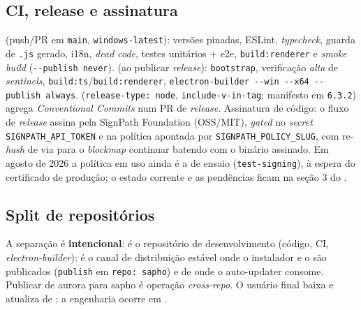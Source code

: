 \subsection{CI, release e assinatura}
\label{sec:S13-ci}
 (push/PR em \texttt{main}, \texttt{windows-latest}): versões pinadas, ESLint, \emph{typecheck}, guarda de \texttt{.js} gerado, i18n, \emph{dead code}, testes unitários + e2e, \texttt{build:renderer} e \emph{smoke build} (\lstinline|--publish never|).  (ao publicar \emph{release}): \texttt{bootstrap}, verificação \emph{alta} de \emph{sentinels}, \texttt{build:ts}/\texttt{build:renderer}, \lstinline|electron-builder --win --x64 --publish always|.  (\lstinline|release-type: node|, \lstinline|include-v-in-tag|; manifesto em \texttt{6.3.2}) agrega \emph{Conventional Commits} num PR de \emph{release}. Assinatura de código: o fluxo de \emph{release} assina pela SignPath Foundation (OSS/MIT), \emph{gated} no \emph{secret} \texttt{SIGNPATH\_API\_TOKEN} e na política apontada por \texttt{SIGNPATH\_POLICY\_SLUG}, com re-\emph{hash} de  via  para o \emph{blockmap} continuar batendo com o binário assinado. Em agosto de 2026 a política em uso ainda é a de ensaio (\texttt{test-signing}), à espera do certificado de produção; o estado corrente e as pendências ficam na seção 3 do .

\subsection{Split de repositórios}
\label{sec:S13-split}
A separação é \textbf{intencional}:  é o repositório de desenvolvimento (código, CI, \emph{electron-builder});  é o canal de distribuição estável onde o instalador e o  são publicados (\texttt{publish} em \lstinline|repo: sapho|) e de onde o auto-updater consome. Publicar de aurora para sapho é operação \emph{cross-repo}. O usuário final baixa e atualiza de ; a engenharia ocorre em .
